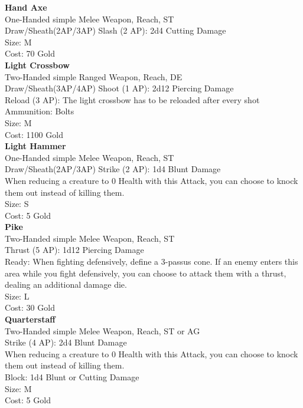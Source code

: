 \textbf{Hand Axe}\label{weapon:handAxe}\\
One-Handed simple Melee Weapon,  Reach, ST\\
Draw/Sheath(2AP/3AP)
Slash (2 AP): 2d4 Cutting Damage\\
Size: M\\
Cost: 70 Gold\\

\textbf{Light Crossbow}\label{weapon:lightCrossbow}\\
Two-Handed simple Ranged Weapon,  Reach, DE\\
Draw/Sheath(3AP/4AP)
Shoot (1 AP): 2d12 Piercing Damage\\
Reload (3 AP): The light crossbow has to be reloaded after every shot\\
Ammunition: Bolts\\
Size: M\\
Cost: 1100 Gold\\

\textbf{Light Hammer}\label{weapon:lightHammer}\\
One-Handed simple Melee Weapon,  Reach, ST\\
Draw/Sheath(2AP/3AP)
Strike (2 AP): 1d4 Blunt Damage\\
When reducing a creature to 0 Health with this Attack, you can choose to knock them out instead of killing them.\\
Size: S\\
Cost: 5 Gold\\

\textbf{Pike}\label{weapon:pike}\\
Two-Handed simple Melee Weapon,  Reach, ST\\
Thrust (5 AP): 1d12 Piercing Damage\\
Ready: When fighting defensively, define a 3-passus cone. If an enemy enters this area while you fight defensively, you can choose to attack them with a thrust, dealing an additional damage die.\\
Size: L\\
Cost: 30 Gold\\

\textbf{Quarterstaff}\label{weapon:quarterstaff}\\
Two-Handed simple Melee Weapon,  Reach, ST or AG\\
Strike (4 AP): 2d4 Blunt Damage\\
When reducing a creature to 0 Health with this Attack, you can choose to knock them out instead of killing them.\\
Block: 1d4 Blunt or Cutting Damage\\
Size: M\\
Cost: 5 Gold\\

